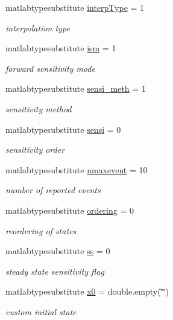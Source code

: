 \begin{DoxyCompactItemize}
matlabtypesubstitute \mbox{\hyperlink{classamioption_ad06cc805fa18b06ac937fd98a9eba0e7}{interp\+Type}} = 1
\begin{DoxyCompactList}\small\item\em interpolation type \end{DoxyCompactList}\item 
matlabtypesubstitute \mbox{\hyperlink{classamioption_aada9d6834569ad5c542cb8dc6b26ea46}{ism}} = 1
\begin{DoxyCompactList}\small\item\em forward sensitivity mode \end{DoxyCompactList}\item 
matlabtypesubstitute \mbox{\hyperlink{classamioption_ab31e219eb42bc06629c3f247a01b9906}{sensi\+\_\+meth}} = 1
\begin{DoxyCompactList}\small\item\em sensitivity method \end{DoxyCompactList}\item 
matlabtypesubstitute \mbox{\hyperlink{classamioption_a7dd31d33463c5a709251bcef0eccaa36}{sensi}} = 0
\begin{DoxyCompactList}\small\item\em sensitivity order \end{DoxyCompactList}\item 
matlabtypesubstitute \mbox{\hyperlink{classamioption_a85519d27e7231ac625e5b2deee92165a}{nmaxevent}} = 10
\begin{DoxyCompactList}\small\item\em number of reported events \end{DoxyCompactList}\item 
matlabtypesubstitute \mbox{\hyperlink{classamioption_aa5d555210685086c19e5d08afca6685b}{ordering}} = 0
\begin{DoxyCompactList}\small\item\em reordering of states \end{DoxyCompactList}\item 
matlabtypesubstitute \mbox{\hyperlink{classamioption_a8f60c8102d29fcd525162d02eed4566b}{ss}} = 0
\begin{DoxyCompactList}\small\item\em steady state sensitivity flag \end{DoxyCompactList}\item 
matlabtypesubstitute \mbox{\hyperlink{classamioption_aa48da42c617fdb7cf84e9a3f80aa04e8}{x0}} = double.\+empty(\char`\"{}\char`\"{})
\begin{DoxyCompactList}\small\item\em custom initial state \end{DoxyCompactList}\item 

\end{DoxyCompactItemize}
